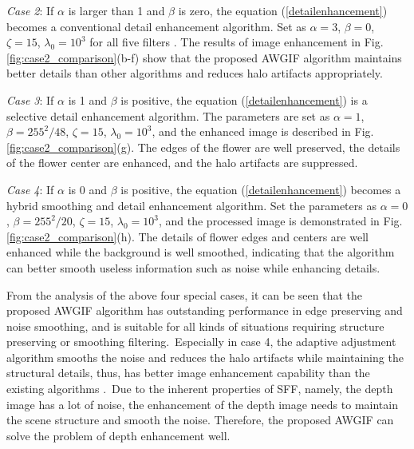 \documentclass[a4paper,fleqn]{cas-dc}
\begin{document}
{\it Case 2}: If $\alpha$ is larger than 1 and $\beta$ is zero, the equation (\ref{detailenhancement}) becomes a conventional detail enhancement algorithm. Set as $\alpha = 3$, $\beta = 0$, $\zeta = 15$, $\lambda_0 = 10^3$ for all five filters \cite{he2013guided,li2015weighted,chen2020weighted,lu2018effictive}. The results of image enhancement in Fig.\ref{fig:case2_comparison}(b-f) show that the proposed AWGIF algorithm maintains better details than other algorithms and reduces halo artifacts appropriately. 

{\it Case 3}: If $\alpha$ is  1 and $\beta$ is positive, the equation (\ref{detailenhancement}) is a selective detail enhancement algorithm. The parameters are set as $\alpha = 1$, $\beta = 255^2/48$, $\zeta = 15$, $\lambda_0 = 10^3$, and the enhanced image is described in Fig.\ref{fig:case2_comparison}(g). The edges of the flower are well preserved, the details of the flower center are enhanced, and the halo artifacts are suppressed.

{\it Case 4}: If $\alpha$ is  0 and $\beta$ is positive, the equation (\ref{detailenhancement}) becomes a hybrid smoothing and detail enhancement algorithm. Set the parameters as $\alpha = 0$, $\beta = 255^2/20$, $\zeta = 15$, $\lambda_0 = 10^3$, and the processed image is demonstrated in Fig.\ref{fig:case2_comparison}(h). The details of flower edges and centers are well enhanced while the background is well smoothed, indicating that the algorithm can better smooth useless information such as noise while enhancing details.

From the analysis of the above four special cases, it can be seen that the proposed AWGIF algorithm has outstanding performance in edge preserving and noise smoothing, and is suitable for all kinds of situations requiring structure preserving or smoothing filtering. Especially in case 4, the adaptive adjustment algorithm smooths the noise and reduces the halo artifacts while maintaining the structural details, thus, has better image enhancement capability than the existing algorithms \cite{he2013guided,li2015weighted,lu2018effictive,chen2020weighted}. Due to the inherent properties of SFF, namely, the depth image has a lot of noise, the enhancement of the depth image needs to maintain the scene structure and smooth the noise. Therefore, the proposed AWGIF can solve the problem of depth enhancement well.
\end{document}
